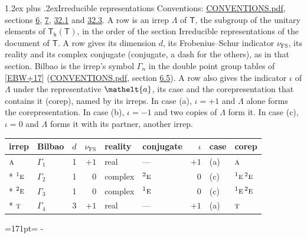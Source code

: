 \documentclass[10pt,a4paper]{article}
\makeatletter
\renewcommand\section{\@startsection{section}{1}{\z@}{-3ex plus -1ex minus -.2ex}%
  {1.2ex plus .2ex}{\normalfont\large\sffamily\bfseries\color{parttitle}}}
\newcommand{\needspace}[1]{\par\penalty-100\begingroup\dimen0=#1\relax\dimen2=\pagegoal
  \advance\dimen2-\pagetotal\ifdim\dimen0>\dimen2\relax\ifdim\dimen2>0pt\vfil\break\fi\fi
  \endgroup}
\numberwithin{equation}{section}
\newcommand{\eltfont}[1]{{\let\sigma\eltsigma\mathelt{#1}}}
\newcommand{\grp}[1]{\mathsf{#1}}
\newcommand{\irr}[1]{\text{\normalfont\scshape #1}}
\newcommand{\conjpair}[1]{{}^{#1}}
\newcommand{\elt}[1]{\eltfont{#1}}
\newcommand{\fsind}{\nu_{\mathrm{FS}}}
\makeatother
\begin{document}
\section{Irreducible representations}\label{s:irreps}
Conventions: \href{../../CONVENTIONS.pdf}{CONVENTIONS.pdf}, sections \href{../../../rotation/CONVENTIONS.pdf\#conv.6}{6}, \href{../../../rotation/CONVENTIONS.pdf\#conv.7}{7}, \href{../../CONVENTIONS.pdf\#conv.32.1}{32.1} and \href{../../CONVENTIONS.pdf\#conv.32.3}{32.3}.
\leavevmode\label{n:irrep.Delta}A row is an irrep $\Lambda$ of $\grp{T}$, the subgroup of the unitary elements of $\grp{T_{h}}(\grp{T})$, in the order of the section Irreducible representations of the document of \href{../../../rotation/data/pdf/T.pdf}{$\grp{T}$}. \label{n:index.dimension}\label{n:index.frobenius}\label{n:head.irrep}\label{n:head.reality}\label{n:head.conjugate}A row gives its dimension $d$, its Frobenius--Schur indicator $\fsind$, its reality and its complex conjugate (conjugate, a dash for the others), as in that section. \label{n:head.bilbao}\label{n:irrep.alias.gamma}Bilbao is the irrep's symbol $\Gamma_n$ in the double point group tables of [\href{../../../REFERENCES.pdf\#ref.EBW+17}{EBW+17}] (\href{../../CONVENTIONS.pdf}{CONVENTIONS.pdf}, section \href{../../../rotation/CONVENTIONS.pdf\#conv.6.5}{6.5}). \label{n:head.case.corep}\label{n:head.corep}A row also gives the indicator $\iota$ of $\Lambda$ under the representative $\elt{a}$, its case and the corepresentation that contains it (corep), named by its irreps. In case (a), $\iota = +1$ and $\Lambda$ alone forms the corepresentation. In case (b), $\iota = -1$ and two copies of $\Lambda$ form it. In case (c), $\iota = 0$ and $\Lambda$ forms it with its partner, another irrep.
\setlength{\emergencystretch}{2em}\par\setlength{\emergencystretch}{0pt}
{\small\renewcommand{\arraystretch}{1.25}\setlength{\tabcolsep}{4pt}\begin{longtable}{@{}llrrllrll@{}}\toprule
irrep & Bilbao & $d$ & $\fsind$ & reality & conjugate & $\iota$ & case & corep\\\midrule\endhead
\bottomrule\endfoot\endlastfoot
$\irr{a}$ & $\Gamma_{1}$ & 1 & $+1$ & real & --- & $+1$ & (a) & $\irr{a}$\\*
$\conjpair{1}\irr{e}$ & $\Gamma_{2}$ & 1 & $0$ & complex & $\conjpair{2}\irr{e}$ & $0$ & (c) & $\conjpair{1}\irr{e}\,\conjpair{2}\irr{e}$\\*
$\conjpair{2}\irr{e}$ & $\Gamma_{3}$ & 1 & $0$ & complex & $\conjpair{1}\irr{e}$ & $0$ & (c) & $\conjpair{1}\irr{e}\,\conjpair{2}\irr{e}$\\*
$\irr{t}$ & $\Gamma_{4}$ & 3 & $+1$ & real & --- & $+1$ & (a) & $\irr{t}$\\
\bottomrule\end{longtable}}
\needspace{171pt}
\end{document}

